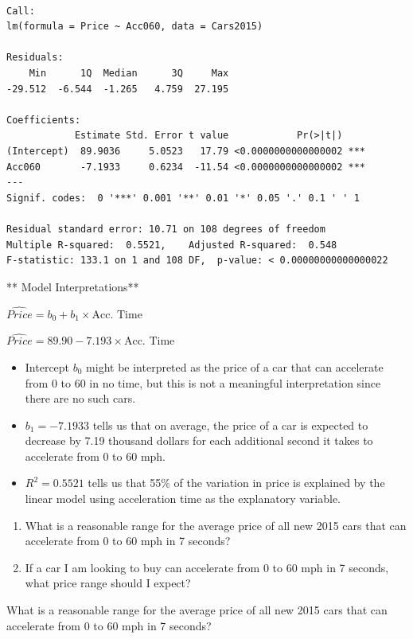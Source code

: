 \documentclass[
  letterpaper,
  DIV=11,
  numbers=noendperiod]{scrreprt}
\begin{document}
\begin{verbatim}

Call:
lm(formula = Price ~ Acc060, data = Cars2015)

Residuals:
    Min      1Q  Median      3Q     Max 
-29.512  -6.544  -1.265   4.759  27.195 

Coefficients:
            Estimate Std. Error t value            Pr(>|t|)    
(Intercept)  89.9036     5.0523   17.79 <0.0000000000000002 ***
Acc060       -7.1933     0.6234  -11.54 <0.0000000000000002 ***
---
Signif. codes:  0 '***' 0.001 '**' 0.01 '*' 0.05 '.' 0.1 ' ' 1

Residual standard error: 10.71 on 108 degrees of freedom
Multiple R-squared:  0.5521,    Adjusted R-squared:  0.548 
F-statistic: 133.1 on 1 and 108 DF,  p-value: < 0.00000000000000022
\end{verbatim}

** Model Interpretations**

\(\widehat{Price} = b_0 + b_1\times\text{Acc. Time}\)

\(\widehat{Price} = 89.90 - 7.193\times\text{Acc. Time}\)

\begin{itemize}
\item
  Intercept \(b_0\) might be interpreted as the price of a car that can
  accelerate from 0 to 60 in no time, but this is not a meaningful
  interpretation since there are no such cars.
\item
  \(b_1=-7.1933\) tells us that on average, the price of a car is
  expected to decrease by 7.19 thousand dollars for each additional
  second it takes to accelerate from 0 to 60 mph.
\item
  \(R^2 = 0.5521\) tells us that 55\% of the variation in price is
  explained by the linear model using acceleration time as the
  explanatory variable.
\end{itemize}

\begin{enumerate}
\def\labelenumi{\arabic{enumi}.}
\item
  What is a reasonable range for the average price of all new 2015 cars
  that can accelerate from 0 to 60 mph in 7 seconds?
\item
  If a car I am looking to buy can accelerate from 0 to 60 mph in 7
  seconds, what price range should I expect?
\end{enumerate}

What is a reasonable range for the average price of all new 2015 cars
that can accelerate from 0 to 60 mph in 7 seconds?
\end{document}
